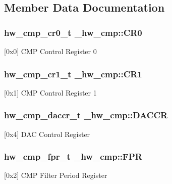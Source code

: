 \subsection{Member Data Documentation}
\subsubsection[{\texorpdfstring{C\+R0}{CR0}}]{ {\bf hw\+\_\+cmp\+\_\+cr0\+\_\+t} \+\_\+hw\+\_\+cmp\+::\+C\+R0}\hypertarget{struct__hw__cmp_abaa10290f1f494df3aea91dbf2abd876}{}\label{struct__hw__cmp_abaa10290f1f494df3aea91dbf2abd876}
\mbox{[}0x0\mbox{]} C\+MP Control Register 0 
\subsubsection[{\texorpdfstring{C\+R1}{CR1}}]{ {\bf hw\+\_\+cmp\+\_\+cr1\+\_\+t} \+\_\+hw\+\_\+cmp\+::\+C\+R1}\hypertarget{struct__hw__cmp_a851b0709bcfdfe91bdb5d4936d1f4958}{}\label{struct__hw__cmp_a851b0709bcfdfe91bdb5d4936d1f4958}
\mbox{[}0x1\mbox{]} C\+MP Control Register 1 
\subsubsection[{\texorpdfstring{D\+A\+C\+CR}{DACCR}}]{ {\bf hw\+\_\+cmp\+\_\+daccr\+\_\+t} \+\_\+hw\+\_\+cmp\+::\+D\+A\+C\+CR}\hypertarget{struct__hw__cmp_a6789df9d1a656eb8233915761dc8cc96}{}\label{struct__hw__cmp_a6789df9d1a656eb8233915761dc8cc96}
\mbox{[}0x4\mbox{]} D\+AC Control Register 
\subsubsection[{\texorpdfstring{F\+PR}{FPR}}]{ {\bf hw\+\_\+cmp\+\_\+fpr\+\_\+t} \+\_\+hw\+\_\+cmp\+::\+F\+PR}\hypertarget{struct__hw__cmp_abbf266f17ce2e9c92f5b643496896c79}{}\label{struct__hw__cmp_abbf266f17ce2e9c92f5b643496896c79}
\mbox{[}0x2\mbox{]} C\+MP Filter Period Register 
